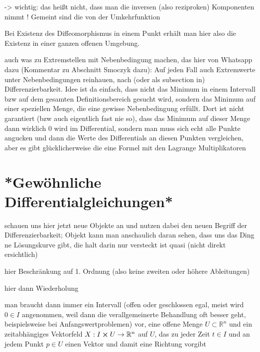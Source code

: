 \documentclass[../H_Analysis_main.tex]{subfiles}
\begin{document}
-> wichtig: das heißt nicht, dass man die inversen (also reziproken) Komponenten nimmt ! Gemeint sind die von der Umkehrfunktion


\begin{satz}

\end{satz}
Bei Existenz des Diffeomorphismus in einem Punkt erhält man hier also die Existenz in einer ganzen offenen Umgebung.



auch was zu Extremstellen mit Nebenbedingung machen, das hier von Whatsapp dazu (Kommentar zu Abschnitt Smoczyk dazu): Auf jeden Fall auch Extremwerte unter Nebenbedingungen reinhauen, nach (oder als subsection in) Differenzierbarkeit. Idee ist da einfach, dass nicht das Minimum in einem Intervall bzw auf dem gesamten Definitionsbereich gesucht wird, sondern das Minimum auf einer speziellen Menge, die eine gewisse Nebenbedingung erfüllt. Dort ist nicht garantiert (bzw auch eigentlich fast nie so), dass das Minimum auf dieser Menge dann wirklich 0 wird im Differential, sondern man muss sich echt alle Punkte angucken und dann die Werte des Differentials an diesen Punkten vergleichen, aber es gibt glücklicherweise die eine Formel mit den Lagrange Multiplikatoren


\newpage


	\section{*Gewöhnliche Differentialgleichungen*}\label{sec:gdgl}
schauen uns hier jetzt neue Objekte an und nutzen dabei den neuen Begriff der Differenzierbarkeit; Objekt kann man anschaulich daran sehen, dass uns das Ding ne Lösungskurve gibt, die halt darin nur versteckt ist quasi (nicht direkt ersichtlich)

hier Beschränkung auf 1. Ordnung (also keine zweiten oder höhere Ableitungen)

hier dann Wiederholung 

man braucht dann immer ein Intervall (offen oder geschlossen egal, meist wird $0 \in I$ angenommen, weil dann die verallgemeinerte Behandlung oft besser geht, beispielsweise bei Anfangswertproblemen) vor, eine offene Menge $U \subset \mathbb{R}^n$ und ein zeitabhängiges Vektorfeld $X: I \cross U \rightarrow \mathbb{R}^n$ auf $U$, das zu jeder Zeit $t \in I$ und an jedem Punkt $p \in U$ einen Vektor und damit eine Richtung vorgibt
\end{document}
